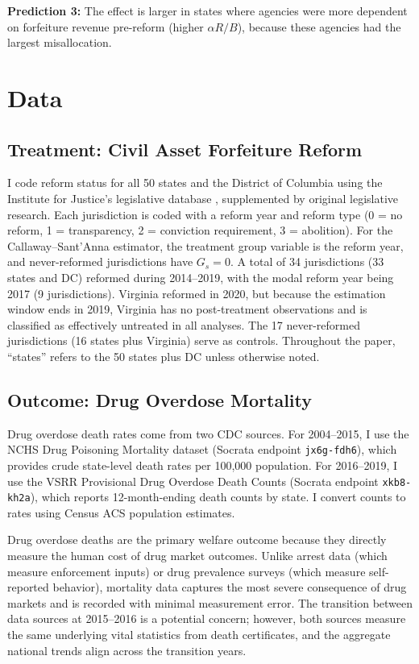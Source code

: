 \documentclass[12pt]{article}
\begin{document}
\textbf{Prediction 3:} The effect is larger in states where agencies were more dependent on forfeiture revenue pre-reform (higher $\alpha R / B$), because these agencies had the largest misallocation.


\section{Data}
\label{sec:data}

\subsection{Treatment: Civil Asset Forfeiture Reform}

I code reform status for all 50 states and the District of Columbia using the Institute for Justice's legislative database \citep{carpenter2020policing}, supplemented by original legislative research. Each jurisdiction is coded with a reform year and reform type (0 = no reform, 1 = transparency, 2 = conviction requirement, 3 = abolition). For the Callaway--Sant'Anna estimator, the treatment group variable is the reform year, and never-reformed jurisdictions have $G_s = 0$. A total of 34 jurisdictions (33 states and DC) reformed during 2014--2019, with the modal reform year being 2017 (9 jurisdictions). Virginia reformed in 2020, but because the estimation window ends in 2019, Virginia has no post-treatment observations and is classified as effectively untreated in all analyses. The 17 never-reformed jurisdictions (16 states plus Virginia) serve as controls. Throughout the paper, ``states'' refers to the 50 states plus DC unless otherwise noted.

\subsection{Outcome: Drug Overdose Mortality}

Drug overdose death rates come from two CDC sources. For 2004--2015, I use the NCHS Drug Poisoning Mortality dataset (Socrata endpoint \texttt{jx6g-fdh6}), which provides crude state-level death rates per 100,000 population. For 2016--2019, I use the VSRR Provisional Drug Overdose Death Counts (Socrata endpoint \texttt{xkb8-kh2a}), which reports 12-month-ending death counts by state. I convert counts to rates using Census ACS population estimates.

Drug overdose deaths are the primary welfare outcome because they directly measure the human cost of drug market outcomes. Unlike arrest data (which measure enforcement inputs) or drug prevalence surveys (which measure self-reported behavior), mortality data captures the most severe consequence of drug markets and is recorded with minimal measurement error. The transition between data sources at 2015--2016 is a potential concern; however, both sources measure the same underlying vital statistics from death certificates, and the aggregate national trends align across the transition years.
\end{document}
